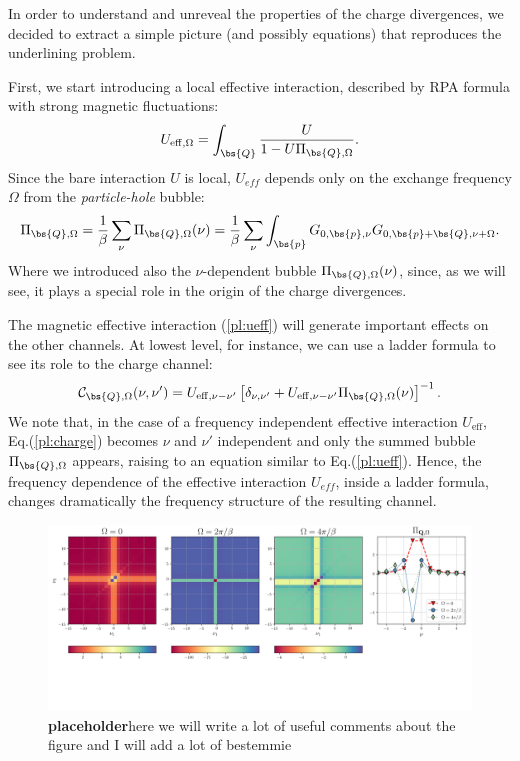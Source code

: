 In order to understand and unreveal the properties of the charge divergences, we decided to 
extract a simple picture (and possibly equations) that reproduces the 
underlining problem. 

First, we start introducing a local effective interaction, described by RPA formula
with strong magnetic fluctuations:
\begin{equation}
	U_{\mathrm{eff},\Omega} = \int_{\bs{Q}} \frac{U}{1- U \Pi_{\bs{Q},\Omega}}.
\label{pl:ueff}
\end{equation}
Since the bare interaction $U$ is local, $U_{eff}$ depends only on the exchange 
frequency $\Omega$ from the \textit{particle-hole} bubble:
\begin{equation}
	\Pi_{\bs{Q},\Omega} = \frac{1}{\beta} \sum_{\nu} \Pi_{\bs{Q},\Omega}(\nu) 
	= \frac{1}{\beta} \sum_{\nu} \int_{\bs{p}} G_{0,\bs{p},\nu} G_{0,\bs{p}+\bs{Q},\nu+\Omega}.
\end{equation}
Where we introduced also the $\nu$-dependent bubble $\Pi_{\bs{Q},\Omega}(\nu)$, since, as we will 
see, it plays a special role in the origin of the charge divergences.

The magnetic effective interaction (\ref{pl:ueff}) will generate important effects on the other channels. 
At lowest level, for instance, we can use a ladder formula to see its role to the charge channel:
\begin{equation}
	\mathcal{C}_{\bs{Q},\Omega} (\nu,\nu') = U_{\mathrm{eff},\nu-\nu'} \left[ \delta_{\nu,\nu'} + U_{\mathrm{eff},\nu-\nu'}\Pi_{\bs{Q},\Omega}(\nu) \right]^{-1}.
\label{pl:charge}
\end{equation}
We note that, in the case of a frequency independent effective interaction $U_{\mathrm{eff}}$, Eq.(\ref{pl:charge}) becomes $\nu$ and $\nu'$ independent 
and only the summed bubble $\Pi_{\bs{Q},\Omega}$ appears, raising to an equation similar to Eq.(\ref{pl:ueff}).
Hence, the frequency dependence of the effective interaction $U_{eff}$, inside a ladder formula, changes dramatically the frequency structure of the 
resulting channel. 

\begin{figure}
\includegraphics[width=\textwidth]{images/PL_all.png}
\vspace*{-2.0cm}
\caption{\textbf{placeholder}here we will write a lot of useful comments about the figure and I will add a lot of bestemmie} 
\label{fig:perpladder}
\end{figure}

